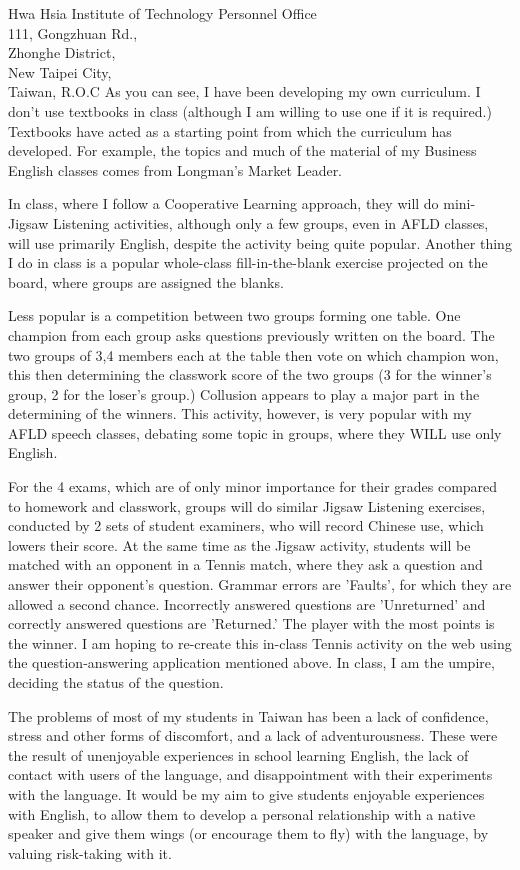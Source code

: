 \documentclass{letter}
\begin{document}
\begin{letter}{
Hwa Hsia Institute of Technology Personnel Office \\ 111, Gongzhuan Rd., \\ Zhonghe District, \\ New Taipei City, \\ Taiwan, R.O.C}
As you can see, I have been developing my own curriculum. I don't use textbooks in class (although I am willing to use one if it is required.) Textbooks have acted as a starting point from which the curriculum has developed. For example, the topics and much of the material of my Business English classes comes from Longman's Market Leader.
 
In class, where I follow a Cooperative Learning approach, they will do mini-Jigsaw Listening activities, although only a few groups, even in AFLD classes, will use primarily English, despite the activity being quite popular. Another thing I do in class is a popular whole-class fill-in-the-blank exercise projected on the board, where groups are assigned the blanks.

Less popular is a competition between two groups forming one table. One champion from each group asks questions previously written on the board. The two groups of 3,4 members each at the table then vote on which champion won, this then determining the classwork score of the two groups (3 for the winner's group, 2 for the loser's group.) Collusion appears to play a major part in the determining of the winners. This activity, however, is very popular with my AFLD speech classes, debating some topic in groups, where they WILL use only English.

For the 4 exams, which are of only minor importance for their grades compared to homework and classwork, groups will do similar Jigsaw Listening exercises, conducted by 2 sets of student examiners, who will record Chinese use, which lowers their score. At the same time as the Jigsaw activity, students will be matched with an opponent in a Tennis match, where they ask a question and answer their opponent's question. Grammar errors are 'Faults', for which they are allowed a second chance. Incorrectly answered questions are 'Unreturned' and correctly answered questions are 'Returned.' The player with the most points is the winner. I am hoping to re-create this in-class Tennis activity on the web using the question-answering application mentioned above. In class, I am the umpire, deciding the status of the question. 

The problems of most of my students in Taiwan has been a lack of confidence, stress and other forms of discomfort, and a lack of adventurousness. These were the result of unenjoyable experiences in school learning English, the lack of contact with users of the language, and disappointment with their experiments with the language. It would be my aim to give students enjoyable experiences with English, to allow them to develop a personal relationship with a native speaker and give them wings (or encourage them to fly) with the language, by valuing risk-taking with it. 


\end{letter}
\end{document}
